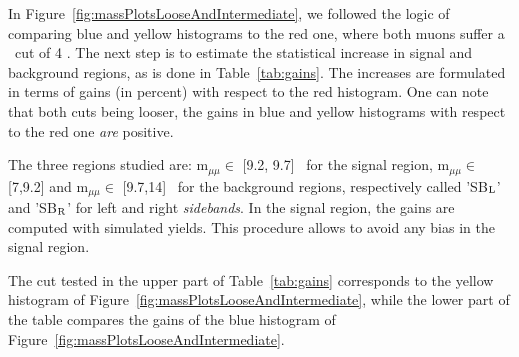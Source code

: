 

In Figure~\ref{fig:massPlotsLooseAndIntermediate}, we followed the
logic of comparing blue and yellow histograms to the red one, where
both muons suffer a \pt\ cut of 4 \GeVc. The next step is to estimate
the statistical increase in signal and background regions, as is done
in Table~\ref{tab:gains}. The increases are formulated in terms of
gains (in percent) with respect to
the red histogram. One can note that both cuts being looser, the gains
in blue and yellow histograms with respect to the red one \textit{are} positive.

The three regions studied are: m$_{\mu\mu}\in$
[9.2, 9.7] \unitMass\ for the signal region,  m$_{\mu\mu}\in$ [7,9.2] and
m$_{\mu\mu}\in$ [9.7,14] \unitMass\ for the background regions,
respectively called 'SB$_{\rm L}$' and 'SB$_{\rm R}$' for left and
right \textit{sidebands}. In the
signal region, the gains are computed with simulated yields.
This procedure allows to avoid any bias in the signal region.

 The cut
tested in the upper part of Table~\ref{tab:gains} corresponds to the
yellow histogram of Figure~\ref{fig:massPlotsLooseAndIntermediate},
while the lower part of the table compares the gains of the blue
histogram of Figure~\ref{fig:massPlotsLooseAndIntermediate}.

